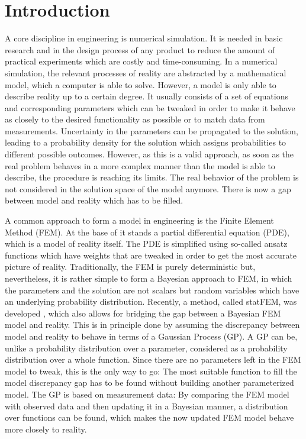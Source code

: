 \documentclass[%
  a4paper,oneside,%
  11pt,%
  smallchapters,
  style=printdev,
  extramargin,
  green,%
  rgb, <cmyk>
  ]{tubsbook}
\begin{document}
\tableofcontents


\chapter{Introduction}

A core discipline in engineering is numerical simulation. It is needed in basic research and in the design process of any product to reduce the amount of practical experiments which are costly and time-consuming. In a numerical simulation, the relevant processes of reality are abstracted by a mathematical model, which a computer is able to solve. \cite{Weisberg2015} However, a model is only able to describe reality up to a certain degree. It usually consists of a set of equations and corresponding parameters which can be tweaked in order to make it behave as closely to the desired functionality as possible or to match data from measurements. Uncertainty in the parameters can be propagated to the solution, leading to a probability density for the solution which assigns probabilities to different possible outcomes. However, as this is a valid approach, as soon as the real problem behaves in a more complex manner than the model is able to describe, the procedure is reaching its limits. The real behavior of the problem is not considered in the solution space of the model anymore.%
There is now a gap between model and reality which has to be filled.

A common approach to form a model in engineering is the Finite Element Method (FEM). At the base of it stands a partial differential equation (PDE), which is a model of reality itself. The PDE is simplified using so-called ansatz functions which have weights that are tweaked in order to get the most accurate picture of reality. Traditionally, the FEM is purely deterministic but, nevertheless, it is rather simple to form a Bayesian approach to FEM, in which the parameters and the solution are not scalars but random variables which have an underlying probability distribution. 
Recently, a method, called statFEM, was developed \cite{girolami2021}, which also allows for bridging the gap between a Bayesian FEM model and reality. This is in principle done by assuming the discrepancy between model and reality to behave in terms of a Gaussian Process (GP). A GP can be, unlike a probability distribution over a parameter, considered as a probability distribution over a whole function. Since there are no parameters left in the FEM model to tweak, this is the only way to go: The most suitable function to fill the model discrepancy gap has to be found without building another parameterized model. The GP is based on measurement data: By comparing the FEM model with observed data and then updating it in a Bayesian manner, a distribution over functions can be found, which makes the now updated FEM model behave more closely to reality.
\end{document}
